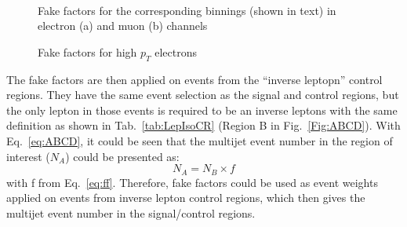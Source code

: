 \begin{figure}[ht]
       \centering
        \\
       \caption{Fake factors for the corresponding binnings (shown in text) in electron (a) and muon (b) channels}
       \label{fig:fakefactor}
\end{figure}

\begin{figure}[ht]
       \centering
       \caption{Fake factors for high $p_T$ electrons}
       \label{fig:fakefactor_el_highPt}
\end{figure}
\noindent
The fake factors are then applied on events from the ``inverse leptopn'' control regions. They have the same event selection as the signal and control regions, but the only lepton in those events is required to be an inverse leptons with the same definition as shown in Tab.~\ref{tab:LepIsoCR} (Region B in Fig.~\ref{Fig:ABCD}). With Eq.~\ref{eq:ABCD}, it could be seen that the multijet event number in the region of interest ($N_A$) could be presented as:
\begin{equation}
N_A = N_B \times f
\end{equation}
with f from Eq.~\ref{eq:ff}. Therefore, fake factors could be used as event weights applied on events from inverse lepton control regions, which then gives the multijet event number in the signal/control regions. 
